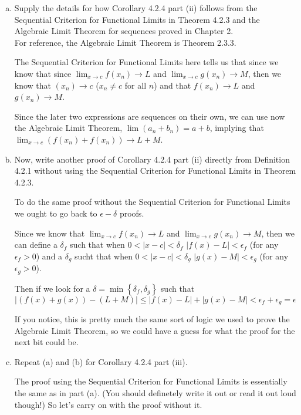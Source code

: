 \begin{enumerate}[(a)]

\item Supply the details for how Corollary 4.2.4 part (ii) follows from the Sequential Criterion for Functional
Limits in Theorem 4.2.3 and the Algebraic Limit Theorem for sequences proved in Chapter 2.
\\

For reference, the Algebraic Limit Theorem is Theorem 2.3.3.

The Sequential Criterion for Functional Limits here tells us that since we know that since
$\lim_{x\rightarrow c} f(x_n) \rightarrow L$ and
$\lim_{x\rightarrow c} g(x_n) \rightarrow M$,
then we know that $(x_n) \rightarrow c$ ($x_n \neq c$ for all $n$)
and that $f(x_n) \rightarrow L$ and $g(x_n) \rightarrow M$.

Since the later two expressions are sequences on their own, we can use now the Algebraic Limit Theorem,
$\lim \left(a_n + b_n\right) = a+b$, implying that
$\lim_{x\rightarrow c} \left( f(x_n) + f(x_n)\right) \rightarrow L + M$.


\item Now, write another proof of Corollary 4.2.4 part (ii) directly from Definition 4.2.1 without using the
Sequential Criterion for Functional Limits in Theorem 4.2.3.

To do the same proof without the Sequential Criterion for Functional Limits we ought to go back to $\epsilon-\delta$ proofs.

Since we know that $\lim_{x\rightarrow c} f(x_n) \rightarrow L$ and
$\lim_{x\rightarrow c} g(x_n) \rightarrow M$, then we can define a $\delta_f$ such that when $0 < |x-c| < \delta_f$ $|f(x) - L|<\epsilon_f$
(for any $\epsilon_f > 0$)
and a $\delta_g$ sucht that when $0 < |x-c| < \delta_g$ $|g(x) - M| < \epsilon_g$ (for any $\epsilon_g > 0$).

Then if we look for a $\delta = \min\left\{\delta_f, \delta_g \right\}$ such that
$$
\left| \left(f(x)+g(x)\right) - \left(L+M\right) \right| \leq
\left|f(x) - L \right| + \left| g(x) - M \right| < \epsilon_f + \epsilon_g = \epsilon
$$

If you notice, this is pretty much the same sort of logic we used to prove the Algebraic Limit Theorem, so we could
have a guess for what the proof for the next bit could be.

\item Repeat (a) and (b) for Corollary 4.2.4 part (iii).

The proof using the Sequential Criterion for Functional Limits is essentially the same as in part (a).
(You should definetely write it out or read it out loud though!)
So let's carry on with the proof without it.


\end{enumerate}
